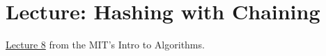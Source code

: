 \chapter{Lecture: Hashing with Chaining}
\href{https://ocw.mit.edu/courses/electrical-engineering-and-computer-science/6-006-introduction-to-algorithms-fall-2011/lecture-videos/lecture-8-hashing-with-chaining/}{Lecture 8} 
from the MIT's  Intro to Algorithms.